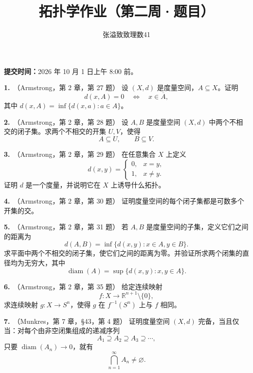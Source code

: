 \documentclass{article}
\title{拓扑学作业（第二周·题目）}
\author{张溢致\quad 致理数41\quad 2024011936}
\date{}
\newcommand{\R}{\mathbb R}
\newcommand{\problem}[2]{\par\medskip\noindent\textbf{#1.}\ （#2）\quad}
\begin{document}
\maketitle

\noindent\textbf{提交时间：}2026 年 10 月 1 日上午 8:00 前。

\problem{1}{Armstrong，第 2 章，第 27 题}
设 $(X,d)$ 是度量空间，$A\subseteq X$。证明
\[
  d(x,A)=0 \quad\Longleftrightarrow\quad x\in\overline A,
\]
其中 $d(x,A)=\inf\{d(x,a):a\in A\}$。

\problem{2}{Armstrong，第 2 章，第 28 题}
设 $A,B$ 是度量空间 $(X,d)$ 中两个不相交的闭子集。求两个不相交的开集 $U,V$，使得
\[
  A\subseteq U,\qquad B\subseteq V.
\]

\problem{3}{Armstrong，第 2 章，第 29 题}
在任意集合 $X$ 上定义
\[
  d(x,y)=
  \begin{cases}
    0,&x=y,\\
    1,&x\ne y.
  \end{cases}
\]
证明 $d$ 是一个度量，并说明它在 $X$ 上诱导什么拓扑。

\problem{4}{Armstrong，第 2 章，第 30 题}
证明度量空间的每个闭子集都是可数多个开集的交。

\problem{5}{Armstrong，第 2 章，第 31 题}
若 $A,B$ 是度量空间的子集，定义它们之间的距离为
\[
  d(A,B)=\inf\{d(x,y):x\in A, y\in B\}.
\]
求平面中两个不相交的闭子集，使它们之间的距离为零。并验证所求两个闭集的直径均为无穷大，其中
\[
  \operatorname{diam}(A)=\sup\{d(x,y):x,y\in A\}.
\]

\problem{6}{Armstrong，第 2 章，第 35 题}
给定连续映射
\[
  f:X\longrightarrow\R^{n+1}\setminus\{0\},
\]
求连续映射 $g:X\to S^n$，使得 $g$ 在 $f^{-1}(S^n)$ 上与 $f$ 相同。

\problem{7}{Munkres，第 7 章，§43，第 4 题}
证明度量空间 $(X,d)$ 完备，当且仅当：对每个由非空闭集组成的递减序列
\[
  A_1\supseteq A_2\supseteq A_3\supseteq\cdots,
\]
只要 $\operatorname{diam}(A_n)\to0$，就有
\[
  \bigcap_{n=1}^{\infty}A_n\ne\varnothing.
\]
\end{document}
